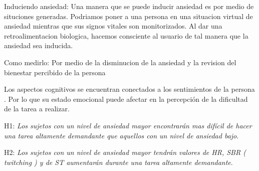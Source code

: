 \documentclass[letterpaper,12pt]{cicese}
\begin{document}
		Induciendo ansiedad: Una manera que se puede inducir ansiedad es por medio de situciones generadas. Podriamos poner a una persona en una situacion virtual de ansiedad mientras que sus signos
		vitales son monitorizados. Al dar una retroalimentacion biologica, hacemos consciente al usuario de tal manera que la ansiedad sea inducida.

		Como medirlo: Por medio de la disminucion de la ansiedad y la revision del bienestar percibido de la persona
		
		Los aspectos cognitivos se encuentran conectados a los sentimientos de la persona \citep{Wilt2011987}. Por lo que su estado emocional puede afectar en la percepci\'on de la dificultad de la tarea a realizar.

		H1: \textit{Los sujetos con un nivel de ansiedad mayor encontrar\'an mas dif\'icil de hacer una tarea altamente demandante que aquellos con un nivel de ansiedad bajo}.
		

		H2: \textit{Los sujetos con un nivel de ansiedad mayor tendr\'an valores de HR, SBR ( twitching ) y  de ST aumentar\'an durante una tarea altamente demandante}.
		\newpage
		
\end{document}

